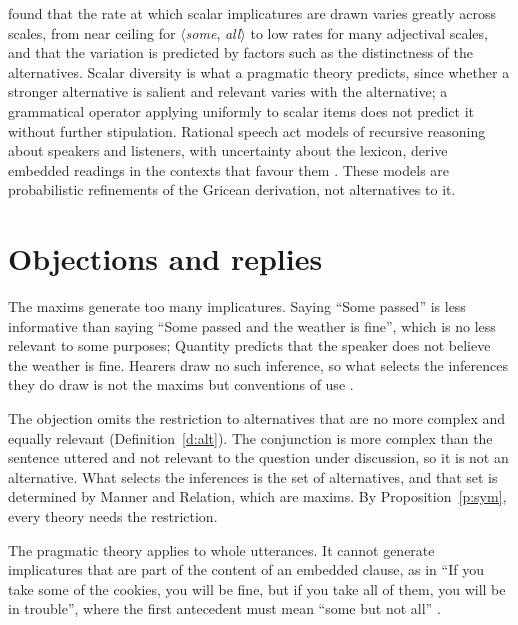 \documentclass{situationist-preprint}
\begin{document}
\citet{vanTieletal2016} found that the rate at which scalar implicatures are drawn varies greatly across scales, from near ceiling for $\langle$\emph{some}, \emph{all}$\rangle$ to low rates for many adjectival scales, and that the variation is predicted by factors such as the distinctness of the alternatives. Scalar diversity is what a pragmatic theory predicts, since whether a stronger alternative is salient and relevant varies with the alternative; a grammatical operator applying uniformly to scalar items does not predict it without further stipulation. Rational speech act models of recursive reasoning about speakers and listeners, with uncertainty about the lexicon, derive embedded readings in the contexts that favour them \citep{Pottsetal2016}. These models are probabilistic refinements of the Gricean derivation, not alternatives to it.

\section{Objections and replies}\label{s:obj}

\begin{objection}[Overgeneration]\label{o:davis}
The maxims generate too many implicatures. Saying \enquote{Some passed} is less informative than saying \enquote{Some passed and the weather is fine}, which is no less relevant to some purposes; Quantity predicts that the speaker does not believe the weather is fine. Hearers draw no such inference, so what selects the inferences they do draw is not the maxims but conventions of use \citep{Davis1998}.
\end{objection}

\begin{reply}
The objection omits the restriction to alternatives that are no more complex and equally relevant (Definition~\ref{d:alt}). The conjunction is more complex than the sentence uttered and not relevant to the question under discussion, so it is not an alternative. What selects the inferences is the set of alternatives, and that set is determined by Manner and Relation, which are maxims. By Proposition~\ref{p:sym}, every theory needs the restriction.
\end{reply}

\begin{objection}[Embedding]\label{o:embed}
The pragmatic theory applies to whole utterances. It cannot generate implicatures that are part of the content of an embedded clause, as in \enquote{If you take some of the cookies, you will be fine, but if you take all of them, you will be in trouble}, where the first antecedent must mean \enquote{some but not all} \citep{Chierchia2004}.
\end{objection}
\end{document}
